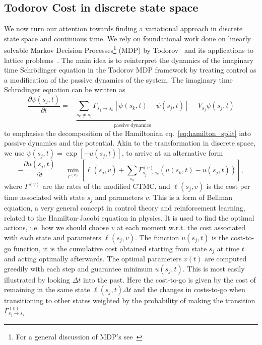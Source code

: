 \subsection{Todorov Cost in discrete state space}
\label{subsec:todorov}
We now turn our attention towards finding a variational approach in discrete state space and continuous time. We rely on foundational work done on linearly solvable Markov Decision Processes\footnote{For a general discussion of MDP's see~\cite{sutton2018reinforcement}} (MDP) by Todorov~\cite{todorov2007linearly, todorov2009efficient} and its applications to lattice problems~\cite{gispen2020ground}. The main idea is to reinterpret the dynamics of the imaginary time Schr\" odinger equation in the Todorov MDP framework by treating control as a modification of the passive dynamics of the system. The imaginary time Schr\" odinger equation can be written as
\begin{equation}
	\label{eq:sch_split}
	\frac{\partial \psi(s_j, t)}{\partial t}=-\underbrace{\sum_{s_k \neq s_j} \Gamma_{s_j \rightarrow s_k}\left[\psi(s_k, t)-\psi(s_j, t)\right]}_{\text{passive dynamics}}
	-V_{s_j} \psi(s_j, t)
\end{equation}
to emphasise the decomposition of the Hamiltonian eq.~\eqref{eq:hamilton_split} into passive dynamics and the potential. Akin to the transformation in discrete space, we use $\psi(s_j, t)=\exp[-u(s_j, t)]$, to arrive at an alternative form
\begin{equation}
	\label{eq:bellman_sch}
	-\frac{\partial u(s_j, t)}{\partial t}=\min _{\Gamma^{(v)}}\left[\ell(s_j, v)+\sum_{s_k} \Gamma_{s_j \rightarrow s_k}^{(v)}(u(s_k, t)-u(s_j, t))\right],
\end{equation}
where $\Gamma^{(v)}$ are the rates of the modified CTMC, and $\ell(s_j, v)$ is the cost per time associated with state $s_j$ and parameters $v$.
This is a form of Bellman equation, a very general concept in control theory and reinforcement learning, related to the Hamilton-Jacobi equation in physics. It is used to find the optimal actions, i.e. how we should choose $v$ at each moment w.r.t. the cost associated with each state and parameters $\ell(s_j, v)$. The function $u(s_j, t)$ is the cost-to-go function, it is the cumulative cost obtained starting from state $s_j$ at time $t$ and acting optimally afterwards. The optimal parameters $v(t)$ are computed greedily with each step and guarantee minimum $u(s_j, t)$. This is most easily illustrated by looking $\Delta t$ into the past. Here the cost-to-go is given by the cost of remaining in the same state $\ell(s_j, t) \Delta t$ and the changes in costs-to-go when transitioning to other states weighted by the probability of making the transition $\Gamma^{(v)}_{s_j \rightarrow s_k}$
